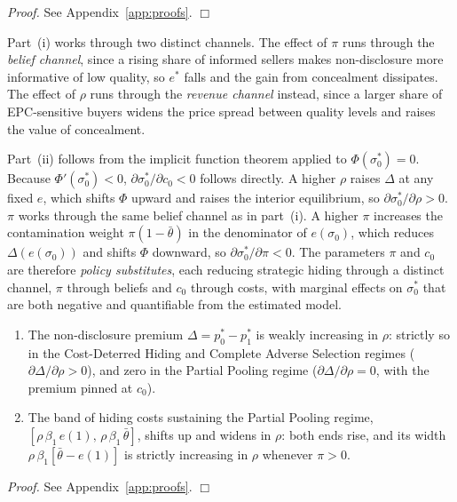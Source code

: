 \noindent\textit{Proof.} See Appendix~\ref{app:proofs}. $\Box$

\noindent Part~(i) works through two distinct channels. The effect of $\pi$ runs through the \textit{belief channel}, since a rising share of informed sellers makes non-disclosure more informative of low quality, so $e^*$ falls and the gain from concealment dissipates. The effect of $\rho$ runs through the \textit{revenue channel} instead, since a larger share of EPC-sensitive buyers widens the price spread between quality levels and raises the value of concealment.

Part~(ii) follows from the implicit function theorem applied to $\Phi(\sigma_0^*)=0$. Because $\Phi'(\sigma_0^*)<0$, $\partial\sigma_0^*/\partial c_0 < 0$ follows directly. A higher $\rho$ raises $\Delta$ at any fixed $e$, which shifts $\Phi$ upward and raises the interior equilibrium, so $\partial\sigma_0^*/\partial\rho > 0$. $\pi$ works through the same belief channel as in part~(i). A higher $\pi$ increases the contamination weight $\pi(1-\bar{\theta})$ in the denominator of $e(\sigma_0)$, which reduces $\Delta(e(\sigma_0))$ and shifts $\Phi$ downward, so $\partial\sigma_0^*/\partial\pi < 0$. The parameters $\pi$ and $c_0$ are therefore \textit{policy substitutes}, each reducing strategic hiding through a distinct channel, $\pi$ through beliefs and $c_0$ through costs, with marginal effects on $\sigma_0^*$ that are both negative and quantifiable from the estimated model.

\begin{corollary}
\label{cor:rho}
\begin{enumerate}[label=(\roman*)]
    \item The non-disclosure premium $\Delta = p_0^* - p_1^*$ is weakly increasing in $\rho$: strictly so in the Cost-Deterred Hiding and Complete Adverse Selection regimes ($\partial\Delta/\partial\rho > 0$), and zero in the Partial Pooling regime ($\partial\Delta/\partial\rho = 0$, with the premium pinned at $c_0$).
    \item The band of hiding costs sustaining the Partial Pooling regime, $[\rho\,\beta_1\,e(1),\,\rho\,\beta_1\,\bar{\theta}]$, shifts up and widens in $\rho$: both ends rise, and its width $\rho\,\beta_1[\bar{\theta}-e(1)]$ is strictly increasing in $\rho$ whenever $\pi>0$.
\end{enumerate}
\end{corollary}

\noindent\textit{Proof.} See Appendix~\ref{app:proofs}. $\Box$

